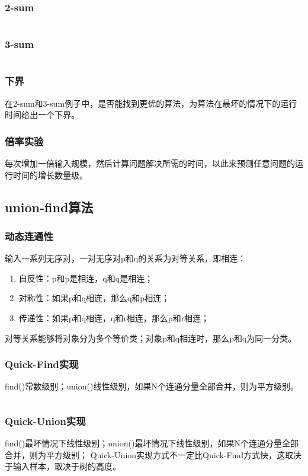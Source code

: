 \documentclass{article}
\begin{document}
  \subsubsection{2-sum}
  \inputminted{java}{src/chapter01/TwoSum.java}

  \subsubsection{3-sum}
  \inputminted{java}{src/chapter01/ThreeSum.java}

  \subsubsection{下界}
  在2-sum和3-sum例子中，是否能找到更优的算法，为算法在最坏的情况下的运行时间给出一个下界。

  \subsubsection{倍率实验}
  每次增加一倍输入规模，然后计算问题解决所需的时间，以此来预测任意问题的运行时间的增长数量级。

  \subsection{union-find算法}
  \subsubsection{动态连通性}
  输入一系列无序对，一对无序对p和q的关系为对等关系，即相连：
  \begin{enumerate}
    \item 自反性：p和p是相连，q和q是相连；
    \item 对称性：如果p和q相连，那么q和p相连；
    \item 传递性：如果p和q相连，q和r相连，那么p和r相连；
  \end{enumerate}
  对等关系能够将对象分为多个等价类；对象p和q相连时，那么p和q为同一分类。

  \subsubsection{Quick-Find实现}
  find()常数级别；union()线性级别，如果N个连通分量全部合并，则为平方级别。
  \inputminted{java}{src/chapter01/QuickFind.java}

  \subsubsection{Quick-Union实现}
  find()最坏情况下线性级别；union()最坏情况下线性级别，如果N个连通分量全部合并，则为平方级别；
  Quick-Union实现方式不一定比Quick-Find方式快，这取决于输入样本，取决于树的高度。
  \inputminted{java}{src/chapter01/QuickUnion.java}
\end{document}
